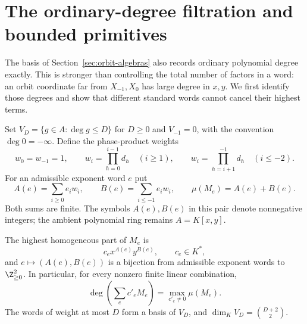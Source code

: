 \section{The ordinary-degree filtration and bounded primitives}
\label{sec:filtered-primitives}

The basis of Section~\ref{sec:orbit-algebras} also records ordinary
polynomial degree exactly.  This is stronger than controlling the total
number of factors in a word: an orbit coordinate far from $X_{-1},X_0$
has large degree in $x,y$.  We first identify those degrees and show that
different standard words cannot cancel their highest terms.

Set $V_D=\{g\in A:\deg g\le D\}$ for $D\ge0$ and $V_{-1}=0$,
with the convention $\deg0=-\infty$.  Define the phase-product weights
\begin{equation}
  w_0=w_{-1}=1,\qquad
  w_i=\prod_{h=0}^{i-1}d_h\quad(i\ge1),\qquad
  w_i=\prod_{h=i+1}^{-1}d_h\quad(i\le-2).
  \label{eq:phase-weights}
\end{equation}
For an admissible exponent word $e$ put
\begin{equation}
  A(e)=\sum_{i\ge0}e_iw_i,\qquad
  B(e)=\sum_{i\le-1}e_iw_i,\qquad
  \mu(M_e)=A(e)+B(e).
  \label{eq:word-degree}
\end{equation}
Both sums are finite.  The symbols $A(e),B(e)$ in this pair denote
nonnegative integers; the ambient polynomial ring remains $A=K[x,y]$.

\begin{lemma}
\label{lem:degree-basis}
The highest homogeneous part of $M_e$ is
\begin{equation}
  c_e x^{A(e)}y^{B(e)},\qquad c_e\in K^*,
  \label{eq:word-highest-term}
\end{equation}
and $e\mapsto(A(e),B(e))$ is a bijection from admissible exponent
words to $\Z_{\ge0}^2$.  In particular, for every nonzero finite
linear combination,
\begin{equation}
  \deg\left(\sum_e c'_eM_e\right)
    =\max_{c'_e\ne0}\mu(M_e).
  \label{eq:degree-no-cancellation}
\end{equation}
The words of weight at most $D$ form a basis of $V_D$, and
$\dim_K V_D=\binom{D+2}{2}$.
\end{lemma}

